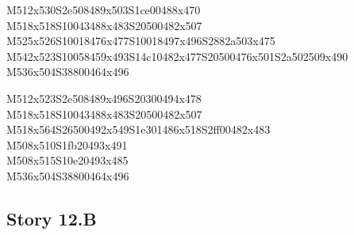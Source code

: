 \documentclass{article}
\begin{document}
\begin{multicols}{5}
\begin{center}
M512x530S2e508489x503S1ce00488x470 %
\\M518x518S10043488x483S20500482x507 %
\\M525x526S10018476x477S10018497x496S2882a503x475 %
\\M542x523S10058459x493S14c10482x477S20500476x501S2a502509x490 %
\\M536x504S38800464x496 %

M512x523S2e508489x496S20300494x478 %
\\M518x518S10043488x483S20500482x507 %
\\M518x564S26500492x549S1e301486x518S2ff00482x483 %
\\M508x510S1fb20493x491 %
\\M508x515S10e20493x485 %
\\M536x504S38800464x496 %

\end{center}
\end{multicols}

\subsection{Story 12.B}
\end{document}
